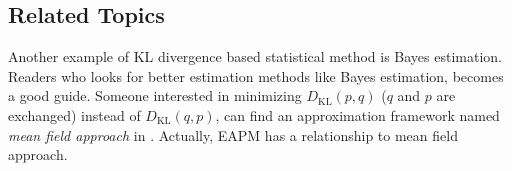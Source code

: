 \subsection{Related Topics}
Another example of KL divergence based statistical method is Bayes estimation.
Readers who looks for better estimation methods like Bayes estimation,
\cite{bishop:ml} becomes a good guide.
Someone interested in minimizing $D_{\mathrm{KL}}(p,q)$ ($q$ and $p$
are exchanged)
instead of $D_{\mathrm{KL}}(q,p)$,
can find an approximation framework named {\it mean field
approach} in \cite{opper:mf}. 
Actually, EAPM has a relationship to mean field approach.